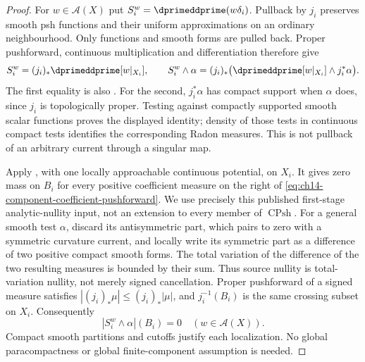 \begin{proof}
For $w\in\mathscr A(X)$ put $S_i^w=\dprimeddprime(w\delta_i)$.
Pullback by $j_i$ preserves smooth psh functions and their uniform
approximations on an ordinary neighbourhood.  Only functions and smooth
forms are pulled back.  Proper pushforward, continuous multiplication and
differentiation therefore give
\begin{equation}
 S_i^w
    =(j_i)_*\dprimeddprime[w|_{X_i}],
 \qquad
 S_i^w\wedge\alpha
    =(j_i)_*\bigl(\dprimeddprime[w|_{X_i}]
                              \wedge j_i^*\alpha\bigr).
 \label{eq:ch14-component-coefficient-pushforward}
\end{equation}
The first equality is also \cite[Proposition~8.5.6]{CLD25}.
For the second, $j_i^*\alpha$ has compact support when $\alpha$ does,
since $j_i$ is topologically proper.  Testing against compactly supported
smooth scalar functions proves the displayed identity; density of those
tests in continuous compact tests identifies the corresponding Radon
measures.  This is not pullback of an arbitrary current through a singular
map.

Apply \cite[Corollary~16.9.4]{CLD25}, with one locally approachable
continuous potential, on $X_i$.  It gives zero mass on $B_i$ for every
positive coefficient measure on the right of
\eqref{eq:ch14-component-coefficient-pushforward}.  We use precisely this
published first-stage analytic-nullity input, not an extension to every
member of $\operatorname{CPsh}$.  For a general smooth test $\alpha$,
discard its antisymmetric part, which pairs to zero with a symmetric
curvature current, and locally write its symmetric part as a difference
of two positive compact smooth forms.  The total variation of the
difference of the two resulting measures is bounded by their sum.
Thus source nullity is total-variation nullity, not merely signed
cancellation.  Proper pushforward of a signed measure satisfies
$|(j_i)_*\mu|\leq(j_i)_*|\mu|$, and $j_i^{-1}(B_i)$ is the same crossing
subset on $X_i$.  Consequently
\begin{equation}
                         |S_i^w\wedge\alpha|(B_i)=0
                         \quad(w\in\mathscr A(X)).
 \label{eq:ch14-component-curvature-nullity}
\end{equation}
Compact smooth partitions and cutoffs justify each localization.
No global paracompactness or global finite-component assumption is needed.


\end{proof}
